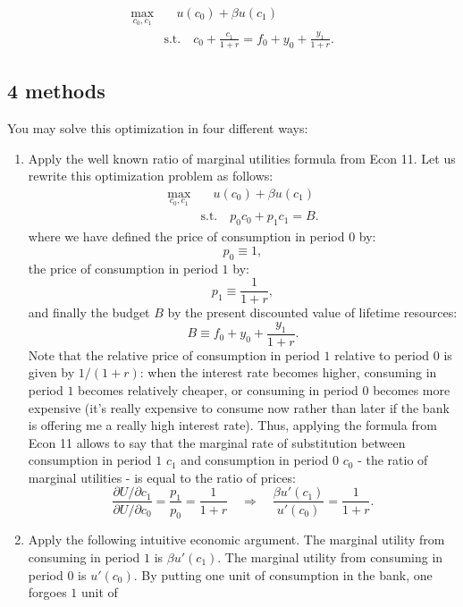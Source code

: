\documentclass[]{book}
\begin{document}
\[
\begin{aligned} 
\max_{c_{0},c_{1}} & \quad u(c_{0})+\beta u(c_{1}) \\
& \text{s.t.} \quad c_{0}+\frac{c_{1}}{1+r}=f_{0}+y_{0}+\frac{y_{1}}{1+r}.
\end{aligned}
\]

\subsection{4 methods}\label{methods}

You may solve this optimization in four different ways:

\begin{enumerate}
\def\labelenumi{\arabic{enumi}.}
\item
  Apply the well known ratio of marginal utilities formula from Econ 11.
  Let us rewrite this optimization problem as follows: \[
  \begin{aligned} 
  \max_{c_{0},c_{1}} & \quad u(c_{0})+\beta u(c_{1}) \\
  & \text{s.t.} \quad p_0c_{0}+p_1 c_1=B.
  \end{aligned}
  \] where we have defined the price of consumption in period \(0\) by:
  \[p_0 \equiv 1,\] the price of consumption in period \(1\) by:
  \[p_1 \equiv \frac{1}{1+r},\] and finally the budget \(B\) by the
  present discounted value of lifetime resources:
  \[B \equiv f_{0}+y_{0}+\frac{y_{1}}{1+r}.\] Note that the relative
  price of consumption in period \(1\) relative to period \(0\) is given
  by \(1/(1+r)\): when the interest rate becomes higher, consuming in
  period \(1\) becomes relatively cheaper, or consuming in period \(0\)
  becomes more expensive (it's really expensive to consume now rather
  than later if the bank is offering me a really high interest rate).
  Thus, applying the formula from Econ 11 allows to say that the
  marginal rate of substitution between consumption in period \(1\)
  \(c_1\) and consumption in period \(0\) \(c_0\) - the ratio of
  marginal utilities - is equal to the ratio of prices:
  \[\frac{\partial U / \partial c_1}{\partial U / \partial c_0} = \frac{p_1}{p_0}= \frac{1}{1+r} \quad\Rightarrow\quad \boxed{\frac{\beta u'(c_{1})}{u'(c_{0})}=\frac{1}{1+r}}.\]
\item
  Apply the following intuitive economic argument. The marginal utility
  from consuming in period \(1\) is \(\beta u'(c_{1})\). The marginal
  utility from consuming in period \(0\) is \(u'(c_{0})\). By putting
  one unit of consumption in the bank, one forgoes \(1\) unit of

\end{enumerate}
\end{document}

